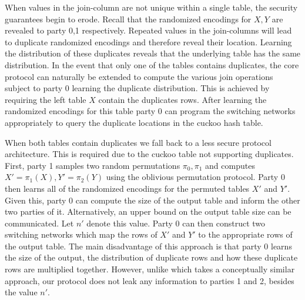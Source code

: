 When values in the join-column are not unique within a single table, the security guarantees begin to erode. Recall that the randomized encodings for $X,Y$ are revealed to party 0,1 respectively. Repeated values in the join-columns will lead to duplicate randomized encodings and therefore reveal their location. Learning the distribution of these duplicates reveals that the underlying table has the same distribution. In the event that only one of the tables contains duplicates, the core protocol can naturally be extended to compute the various join operations subject to party 0 learning the duplicate distribution. This is achieved by requiring the left table $X$ contain the duplicates rows. After learning the randomized encodings for this table party 0 can program the switching networks appropriately to query the duplicate locations in the cuckoo hash table. 


When both tables contain duplicates we fall back to a less secure protocol architecture. This is required due to the cuckoo table not supporting duplicates. First, party 1 samples two random permutations $\pi_0,\pi_1$ and computes $X'=\pi_1(X),Y'=\pi_2(Y)$ using the oblivious permutation protocol. Party 0 then learns all of the randomized encodings for the permuted tables $X'$ and $Y'$. Given this, party 0 can compute the size of the output table and inform the other two parties of it. Alternatively, an upper bound on the output table size can be communicated. Let $n'$ denote this value. Party 0 can then construct two switching networks which map the rows of $X'$ and $Y'$ to the appropriate rows of the output table. The main disadvantage of this approach is that party 0 learns the size of the output, the distribution of duplicate rows and how these duplicate rows are multiplied together. However, unlike \cite{LTW13} which takes a conceptually similar approach, our protocol does not leak any information to parties 1 and 2, besides the value $n'$.


